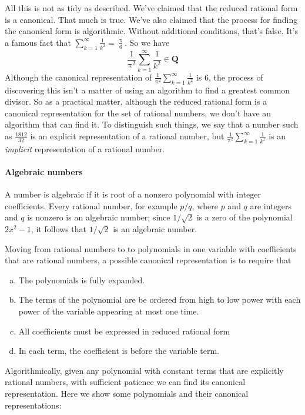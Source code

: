\documentclass[12pt,fleqn]{article}
\newenvironment{alphalist}{
  \begin{enumerate}[(a)]
    \addtolength{\itemsep}{-0.5\itemsep}}
  {\end{enumerate}}
\newcommand{\rationals}{\mathbf{Q}}
\begin{document}
All this is not as tidy as described. We've claimed that the reduced rational form is a canonical. That much is true. We've also claimed that the 
process for finding the canonical form is algorithmic. Without additional conditions, that's false.  It's a famous fact that 
$\sum_{k=1}^\infty \frac{1}{k^2}  = \frac{\uppi}{6}$. So we have
\begin{equation}
\frac{1}{\uppi^2} \sum_{k=1}^\infty \frac{1}{k^2}  \in \rationals
\end{equation}
Although the canonical representation of $\frac{1}{\uppi^2} \sum_{k=1}^\infty \frac{1}{k^2}  $ is 6, the process of discovering this isn't a matter of 
using an algorithm to find a greatest common divisor.  So as a practical matter, although the reduced rational form is a canonical representation for the
set of rational numbers, we don't have an algorithm that can find it.  To distinguish such things, we say that a number such as $\frac{1812}{32}$  is
an explicit representation of a rational number, but $\frac{1}{\uppi^2} \sum_{k=1}^\infty \frac{1}{k^2}  $ is an \emph{implicit} representation of
a rational number.

\paragraph{Algebraic  numbers} A number is algebraic if it is root of a nonzero polynomial with integer coefficients. Every rational number, for example 
$p/q$, where $p$ and $q$ are integers and $q$ is nonzero is an algebraic number; since $1/\sqrt{2}$ is a zero of the polynomial $2 x^2 - 1$, it
follows that $1/\sqrt{2}$ is an algebraic number.


Moving from rational numbers to to polynomials in one variable with coefficients that are rational numbers,  a possible canonical representation is to 
require that
\begin{alphalist}
  \item The polynomials is fully expanded.
  \item The terms of the polynomial are be ordered from high to low power with each power of the variable appearing at most one time.
  \item All coefficients must be expressed in reduced rational form
  \item In each term, the coefficient is before the variable term.
\end{alphalist}
Algorithmically, given any polynomial with constant terms that are explicitly rational numbers, with sufficient patience we can find its canonical representation. Here we show some polynomials and their canonical representations: 
\end{document}
